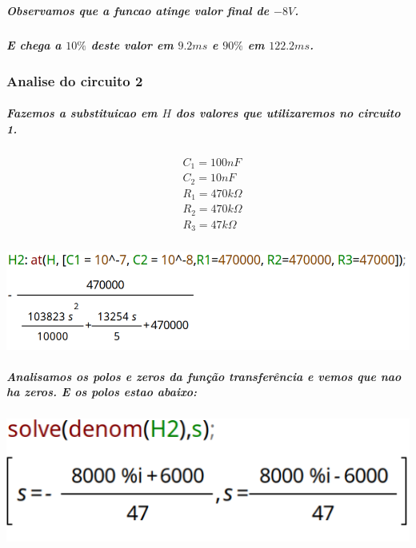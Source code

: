 \documentclass[12pt,twoside, a4paper, twocolumn]{article}
\begin{document}
\subparagraph*{Observamos que a funcao atinge valor final de $-8V$.}

\subparagraph*{E chega a $10\%$ deste valor em $9.2ms$ e $90\%$ em $122.2ms$.}

\subsubsection{Analise do circuito 2}

\subparagraph*{Fazemos a substituicao em $H$ dos valores que utilizaremos no circuito 1.}


\begin{equation*}
    \begin{aligned}
         & C_1  = 100nF          \\
         & C_2  = 10nF           \\
         & R_1  = 470k \varOmega \\
         & R_2  = 470k \varOmega \\
         & R_3  = 47k \varOmega
    \end{aligned}
\end{equation*}


\subparagraph*{}


\begin{adjustbox}{scale=0.34}
    \includegraphics{H2.png}
\end{adjustbox}


\subparagraph*{Analisamos os polos e zeros da função transferência e vemos que nao ha zeros. E os polos estao abaixo:}

\subparagraph*{}

\begin{adjustbox}{scale=0.5}
    \includegraphics{H2denom.png}
\end{adjustbox}
\end{document}
